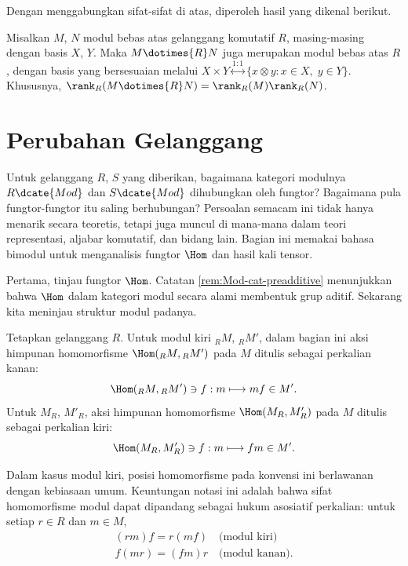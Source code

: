 Dengan menggabungkan sifat-sifat di atas, diperoleh hasil yang dikenal berikut.
\begin{corollary}\label{prop:module-tensor-free}
	Misalkan $M$, $N$ modul bebas atas gelanggang komutatif $R$, masing-masing dengan basis $X$, $Y$. Maka $M \dotimes{R} N$ juga merupakan modul bebas atas $R$, dengan basis yang bersesuaian melalui $X \times Y \stackrel{1:1}{\longleftrightarrow} \{x \otimes y: x \in X,\; y \in Y \}$. Khususnya, $\rank_R( M \dotimes{R} N) = \rank_R(M) \rank_R(N)$.
\end{corollary}

\section{Perubahan Gelanggang}\label{sec:change-of-rings}
Untuk gelanggang $R$, $S$ yang diberikan, bagaimana kategori modulnya $R\dcate{Mod}$ dan $S\dcate{Mod}$ dihubungkan oleh fungtor? Bagaimana pula fungtor-fungtor itu saling berhubungan? Persoalan semacam ini tidak hanya menarik secara teoretis, tetapi juga muncul di mana-mana dalam teori representasi, aljabar komutatif, dan bidang lain. Bagian ini memakai bahasa bimodul untuk menganalisis fungtor $\Hom$ dan hasil kali tensor.

Pertama, tinjau fungtor $\Hom$. Catatan \ref{rem:Mod-cat-preadditive} menunjukkan bahwa $\Hom$ dalam kategori modul secara alami membentuk grup aditif. Sekarang kita meninjau struktur modul padanya.

\begin{convention}\label{con:Hom-assoc}
	Tetapkan gelanggang $R$. Untuk modul kiri ${}_R M$, ${}_R M'$, dalam bagian ini aksi himpunan homomorfisme $\Hom({}_R M, {}_R M')$ pada $M$ ditulis sebagai perkalian kanan:
	\[ \Hom({}_R M, {}_R M') \ni f: m \longmapsto mf \in M'. \]
	Untuk $M_R$, $M'_R$, aksi himpunan homomorfisme $\Hom(M_R, M'_R)$ pada $M$ ditulis sebagai perkalian kiri:
	\[ \Hom(M_R, M'_R) \ni f: m \longmapsto fm \in M'. \]
\end{convention}
Dalam kasus modul kiri, posisi homomorfisme pada konvensi ini berlawanan dengan kebiasaan umum. Keuntungan notasi ini adalah bahwa sifat homomorfisme modul dapat dipandang sebagai hukum asosiatif perkalian: untuk setiap $r \in R$ dan $m \in M$,
\begin{gather*}
	(rm)f = r(mf) \quad \text{(modul kiri)} \\ 
	f(mr) = (fm)r \quad \text{(modul kanan)}.
\end{gather*}

